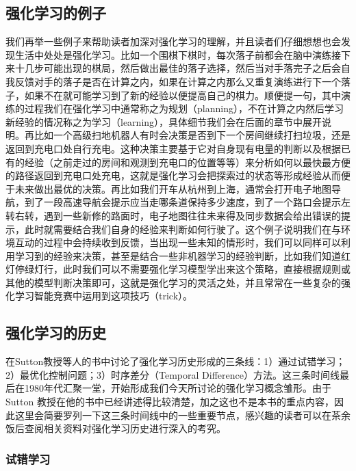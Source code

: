 \subsection{强化学习的例子}

我们再举一些例子来帮助读者加深对强化学习的理解，并且读者们仔细想想也会发现生活中处处是强化学习。比如一个围棋下棋时，每次落子前都会在脑中演练接下来十几步可能出现的棋局，然后做出最佳的落子选择，然后当对手落完子之后会自我反馈对手的落子是否在计算之内，如果在计算之内那么又重复演练进行下一个落子，如果不在就可能学习到了新的经验以便提高自己的棋力。顺便提一句，其中演练的过程我们在强化学习中通常称之为规划（planning），不在计算之内然后学习新经验的情况称之为学习（learning），具体细节我们会在后面的章节中展开说明。再比如一个高级扫地机器人有时会决策是否到下一个房间继续打扫垃圾，还是返回到充电口处自行充电。这种决策主要基于它对自身现有电量的判断以及根据已有的经验（之前走过的房间和观测到充电口的位置等等）来分析如何以最快最方便的路径返回到充电口处充电，这就是强化学习会把探索过的状态等形成经验从而便于未来做出最优的决策。再比如我们开车从杭州到上海，通常会打开电子地图导航，到了一段高速导航会提示应当走哪条道保持多少速度，到了一个路口会提示左转右转，遇到一些新修的路面时，电子地图往往未来得及同步数据会给出错误的提示，此时就需要结合我们自身的经验来判断如何行驶了。这个例子说明我们在与环境互动的过程中会持续收到反馈，当出现一些未知的情形时，我们可以同样可以利用学习到的经验来决策，甚至是结合一些非机器学习的经验判断，比如我们知道红灯停绿灯行，此时我们可以不需要强化学习模型学出来这个策略，直接根据规则或其他的模型判断决策即可，这就是强化学习的灵活之处，并且常常在一些复杂的强化学习智能竞赛中运用到这项技巧（trick）。


\subsection{强化学习的历史}

在Sutton教授等人的书中讨论了强化学习历史形成的三条线：1）通过试错学习；2）最优化控制问题；3）时序差分（Temporal Difference）方法。这三条时间线最后在1980年代汇聚一堂，开始形成我们今天所讨论的强化学习概念雏形。由于 Sutton 教授在他的书中已经讲述得比较清楚，加之这也不是本书的重点内容，因此这里会简要罗列一下这三条时间线中的一些重要节点，感兴趣的读者可以在茶余饭后查阅相关资料对强化学习历史进行深入的考究。

\subsubsection{试错学习}

